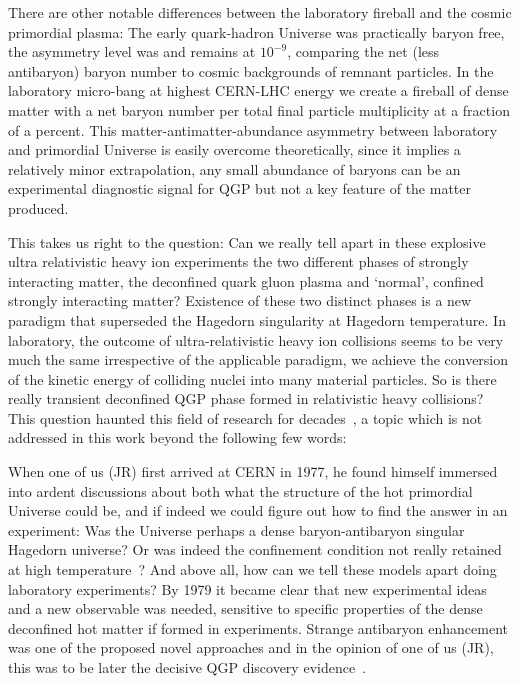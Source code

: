 There are other notable differences between the laboratory fireball and the cosmic primordial plasma: The early quark-hadron Universe was practically baryon free, the asymmetry level was and remains at $10^{-9}$, comparing the net (less antibaryon) baryon number to cosmic backgrounds of remnant particles. In the laboratory micro-bang at highest CERN-LHC energy we create a fireball of dense matter with a net baryon number per total final particle multiplicity at a fraction of a percent. This matter-antimatter-abundance asymmetry between laboratory and primordial Universe is easily overcome theoretically, since it implies a relatively minor extrapolation, any small abundance of baryons can be an experimental diagnostic signal for QGP but not a key feature of the matter produced.

This takes us right to the question: Can we really tell apart in these explosive ultra relativistic heavy ion experiments the two different phases of strongly interacting matter, the deconfined quark gluon plasma and `normal', confined strongly interacting matter? Existence of these two distinct phases is a new paradigm that superseded the Hagedorn singularity at Hagedorn temperature. In laboratory, the outcome of ultra-relativistic heavy ion collisions seems to be very much the same irrespective of the applicable paradigm, we achieve the conversion of the kinetic energy of colliding nuclei into many material particles. So is there really transient deconfined QGP phase formed in relativistic heavy collisions? This question haunted this field of research for decades~\cite{Rafelski:2015cxa,Harris:2024aov}, a topic which is not addressed in this work beyond the following few words: 

When one of us (JR) first arrived at CERN in 1977, he found himself immersed into ardent discussions about both what the structure of the hot primordial Universe could be, and if indeed we could figure out how to find the answer in an experiment: Was the Universe perhaps a dense baryon-antibaryon singular Hagedorn universe? Or was indeed the confinement condition not really retained at high temperature~\cite{Weinberg:1974hy,Harrington:1974fc,Cabibbo:1975ig}? And above all, how can we tell these models apart doing laboratory experiments? By 1979 it became clear that new experimental ideas and a new observable was needed, sensitive to specific properties of the dense deconfined hot matter if formed in experiments. Strange antibaryon enhancement was one of the proposed novel approaches and in the opinion of one of us (JR), this was to be later the decisive QGP discovery evidence~\cite{Rafelski:2019twp}.


